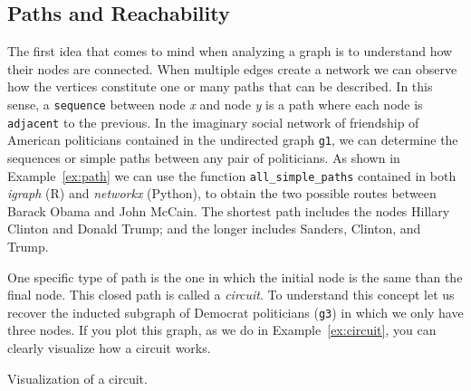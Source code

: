 \subsection{Paths and Reachability}\label{sec:paths}

The first idea that comes to  mind when analyzing a graph is to understand how their nodes are connected. When multiple edges create a network we can observe how the vertices constitute one or many paths that can be described. In this sense, a \texttt{sequence} between node \textit{x} and node \textit{y} is a path where each node is \texttt{adjacent} to the previous. In the imaginary social network of friendship of American politicians contained in the undirected graph \texttt{g1}, we can determine the sequences or simple paths between any pair of politicians. As shown in Example~\ref{ex:path} we can use the function \texttt{all\_simple\_paths} contained in both \emph{igraph} (R) and \emph{networkx} (Python), to obtain the two possible routes between Barack Obama and John McCain. The shortest path includes the nodes Hillary Clinton and Donald Trump; and the longer includes Sanders, Clinton, and Trump.


One specific type of path is the one in which the initial node is the same than the final node. This closed path is called a \emph{circuit}. To understand this concept let us recover the inducted subgraph of Democrat politicians (\texttt{g3}) in which we only have three nodes. If you plot this graph, as we do in Example~\ref{ex:circuit}, you can clearly visualize how a circuit works.

\begin{ccsexample}
  \caption{Visualization of a circuit.}
  \label{ex:circuit}
\end{ccsexample}

